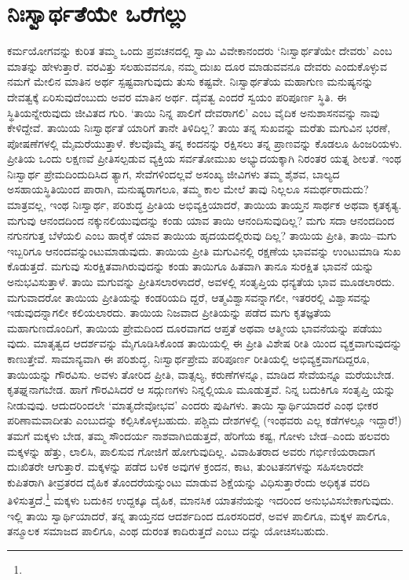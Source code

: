\section{ನಿಃಸ್ವಾರ್ಥತೆಯೇ ಒರೆಗಲ್ಲು}

ಕರ್ಮಯೋಗವನ್ನು ಕುರಿತ ತಮ್ಮ ಒಂದು ಪ್ರವಚನದಲ್ಲಿ ಸ್ವಾಮಿ ವಿವೇಕಾನಂದರು ‘ನಿಃಸ್ವಾರ್ಥತೆಯೇ ದೇವರು’ ಎಂಬ ಮಾತನ್ನು ಹೇಳುತ್ತಾರೆ. ವರವಿತ್ತು ಸಲಹುವವನೂ, ನಮ್ಮ ದುಃಖ ದೂರ ಮಾಡುವವನೂ ದೇವರು ಎಂದುಕೊಳ್ಳುವ ನಮಗೆ ಮೇಲಿನ ಮಾತಿನ ಅರ್ಥ ಸ್ಪಷ್ಟವಾಗುವುದು ತುಸು ಕಷ್ಟವೇ. ನಿಃಸ್ವಾರ್ಥತೆಯ ಮಹಾಗುಣ ಮನುಷ್ಯನನ್ನು ದೇವತ್ವಕ್ಕೆ ಏರಿಸುವುದೆಂಬುದು ಅವರ ಮಾತಿನ ಅರ್ಥ. ದೈವತ್ವ ಎಂದರೆ ಸ್ವಯಂ ಪರಿಪೂರ್ಣ ಸ್ಥಿತಿ. ಈ ಸ್ಥಿತಿಯನ್ನೇರುವುದು ಜೀವಿತದ ಗುರಿ. ‘ತಾಯಿ ನಿನ್ನ ಪಾಲಿಗೆ ದೇವರಾಗಲಿ’ ಎಂಬ ವೈದಿಕ ಅನುಶಾಸನವನ್ನು ನಾವು ಕೇಳಿದ್ದೇವೆ. ತಾಯಿಯ ನಿಃಸ್ವಾರ್ಥತೆ ಯಾರಿಗೆ ತಾನೇ ತಿಳಿದಿಲ್ಲ? ತಾಯಿ ತನ್ನ ಸುಖವನ್ನು ಮರೆತು ಮಗುವಿನ ಭರಣೆ, ಪೋಷಣೆಗಳಲ್ಲಿ ಮೈಮರೆಯುತ್ತಾಳೆ. ಕೆಲವೊಮ್ಮೆ ತನ್ನ ಕಂದನನ್ನು ರಕ್ಷಿಸಲು ತನ್ನ ಪ್ರಾಣವನ್ನು ಕೊಡಲೂ ಹಿಂಜರಿಯಳು. ಪ್ರೀತಿಯ ಒಂದು ಲಕ್ಷಣವೆ ಪ್ರೀತಿಸಲ್ಪಡುವ ವ್ಯಕ್ತಿಯ ಸರ್ವತೋಮುಖ ಅಭ್ಯುದಯಕ್ಕಾಗಿ ನಿರಂತರ ಯತ್ನ ಶೀಲತೆ. ಇಂಥ ನಿಃಸ್ವಾರ್ಥ ಪ್ರೇಮದಿಂದುದಿಸಿದ ತ್ಯಾಗ, ಸೇವೆಗಳಿಂದಲ್ಲವೆ ಅಸಂಖ್ಯ ಜೀವಿಗಳು ತಮ್ಮ ಶೈಶವ, ಬಾಲ್ಯದ ಅಸಹಾಯಸ್ಥಿತಿಯಿಂದ ಪಾರಾಗಿ, ಮನುಷ್ಯರಾಗಲೂ, ತಮ್ಮ ಕಾಲ ಮೇಲೆ ತಾವು ನಿಲ್ಲಲೂ ಸಮರ್ಥರಾದುದು? ಮಾತ್ರವಲ್ಲ, ಇಂಥ ನಿಃಸ್ವಾರ್ಥ, ಪರಿಶುದ್ಧ ಪ್ರೀತಿಯ ಅಭಿವ್ಯಕ್ತಿಯಾದರೆ, ತಾಯಿಯ ತಾಯ್ತನ ಸಾರ್ಥಕ ಅಥವಾ ಕೃತಕೃತ್ಯ. ಮಗುವು ಆನಂದದಿಂದ ನಕ್ಕುನಲಿಯುವುದನ್ನು ಕಂಡು ಯಾವ ತಾಯಿ ಆನಂದಿಸುವುದಿಲ್ಲ? ಮಗು ಸದಾ ಆನಂದದಿಂದ ನಗುನಗುತ್ತ ಬೆಳೆಯಲಿ ಎಂಬ ಹಾರೈಕೆ ಯಾವ ತಾಯಿಯ ಹೃದಯದಲ್ಲಿರುವು ದಿಲ್ಲ? ತಾಯಿಯ ಪ್ರೀತಿ, ತಾಯಿ–ಮಗು ಇಬ್ಬರಿಗೂ ಆನಂದವನ್ನುಂಟುಮಾಡುವುದು. ತಾಯಿಯ ಪ್ರೀತಿ ಮಗುವಿನಲ್ಲಿ ರಕ್ಷಣೆಯ ಭಾವವನ್ನು ಉಂಟುಮಾಡಿ ಸುಖ ಕೊಡುತ್ತದೆ. ಮಗುವು ಸುರಕ್ಷಿತವಾಗಿರುವುದನ್ನು ಕಂಡು ತಾಯಿಗೂ ಹಿತವಾಗಿ ತಾನೂ ಸುರಕ್ಷಿತ ಭಾವನೆ ಯನ್ನು ಅನುಭವಿಸುತ್ತಾಳೆ. ತಾಯಿ ಮಗುವನ್ನು ಪ್ರೀತಿಸಲಾರಳಾದರೆ, ಅವಳಲ್ಲಿ ಸಂತೃಪ್ತಿಯ ಧನ್ಯತೆಯ ಭಾವ ಮೂಡಲಾರದು. ಮಗುವಾದರೋ ತಾಯಿಯ ಪ್ರೀತಿಯನ್ನು ಕಂಡರಿಯದಿ ದ್ದರೆ, ಆತ್ಮವಿಶ್ವಾಸವನ್ನಾಗಲೀ, ಇತರರಲ್ಲಿ ವಿಶ್ವಾಸವನ್ನು ಇಡುವುದನ್ನಾಗಲೀ ಕಲಿಯಲಾರದು. ತಾಯಿಯ ನಿಜವಾದ ಪ್ರೀತಿಯನ್ನು ಪಡೆದ ಮಗು ಕೃತಜ್ಞತೆಯ ಮಹಾಗುಣದೊಂದಿಗೆ, ತಾಯಿಯ ಪ್ರೇಮದಿಂದ ದೂರವಾಗದ ಆಪ್ತತೆ ಅಥವಾ ಆತ್ಮೀಯ ಭಾವನೆಯನ್ನು ಪಡೆಯು ವುದು. ಮಾತೃತ್ವದ ಆದರ್ಶವನ್ನು ಮೈಗೂಡಿಸಿಕೊಂಡ ತಾಯಿಯಲ್ಲಿ ಈ ಪ್ರೀತಿ ವಿಶೇಷ ರೀತಿ ಯಿಂದ ವ್ಯಕ್ತವಾಗುವುದನ್ನು ಕಾಣುತ್ತೇವೆ. ಸಾಮಾನ್ಯವಾಗಿ ಈ ಪರಿಶುದ್ಧ, ನಿಃಸ್ವಾರ್ಥಪ್ರೇಮ ಪರಿಪೂರ್ಣ ರೀತಿಯಲ್ಲಿ ಅಭಿವ್ಯಕ್ತವಾಗದಿದ್ದರೂ, ತಾಯಿಯನ್ನು ಗೌರವಿಸು. ಅವಳು ತೋರಿದ ಪ್ರೀತಿ, ವಾತ್ಸಲ್ಯ, ಕರುಣೆಗಳನ್ನೂ, ಮಾಡಿದ ಸೇವೆಯನ್ನೂ ಮರೆಯಬೇಡ. ಕೃತಘ್ನನಾಗಬೇಡ. ಹಾಗೆ ಗೌರವಿಸಿದರೆ ಆ ಸದ್ಗುಣಗಳು ನಿನ್ನಲ್ಲಿಯೂ ಮೂಡುತ್ತವೆ. ನಿನ್ನ ಬದುಕಿಗೂ ಸಂತೃಪ್ತಿ ಯನ್ನು ನೀಡುವುವು. ಆದುದರಿಂದಲೇ ‘ಮಾತೃದೇವೋಭವ’ ಎಂದರು ಪುಷಿಗಳು. ತಾಯಿ ಸ್ವಾರ್ಥಿಯಾದರೆ ಎಂಥ ಭೀಕರ ಪರಿಣಾಮವಾದೀತು ಎಂಬುದನ್ನು ಕಲ್ಪಿಸಿಕೊಳ್ಳಬಹುದು. ಪಶ್ಚಿಮ ದೇಶಗಳಲ್ಲಿ (ಇಂಥವರು ಎಲ್ಲ ಕಡೆಗಳಲ್ಲೂ ಇದ್ದಾರೆ!) ತಮಗೆ ಮಕ್ಕಳು ಬೇಡ, ತಮ್ಮ ಸೌಂದರ್ಯ ನಾಶವಾಗಿಬಿಡುತ್ತದೆ, ಹೆರಿಗೆಯ ಕಷ್ಟ, ಗೋಳು ಬೇಡ–ಎಂದು ಹಲವರು ಮಕ್ಕಳನ್ನು ಹೆತ್ತು, ಲಾಲಿಸಿ, ಪಾಲಿಸುವ ಗೋಜಿಗೆ ಹೋಗುವುದಿಲ್ಲ. ವಿವಾಹಿತರಾದ ಅವರು ಗರ್ಭಿಣಿಯರಾದಾಗ ದುಃಖಿತರೇ ಆಗುತ್ತಾರೆ. ಮಕ್ಕಳನ್ನು ಪಡೆದ ಬಳಿಕ ಅವುಗಳ ಕ್ರಂದನ, ಕಾಟ, ತುಂಟತನಗಳನ್ನು ಸಹಿಸಲಾರದೇ ಕುಪಿತರಾಗಿ ತೀವ್ರತರದ ದೈಹಿಕ ತೊಂದರೆಯನ್ನುಂಟು ಮಾಡುವ ಶಿಕ್ಷೆಯನ್ನು ವಿಧಿಸುತ್ತಾರೆಂದು ಅಧಿಕೃತ ವರದಿ ತಿಳಿಸುತ್ತದೆ.\footnote{} ಮಕ್ಕಳು ಬದುಕಿನ ಉದ್ದಕ್ಕೂ ದೈಹಿಕ, ಮಾನಸಿಕ ಯಾತನೆಯನ್ನು ಇದರಿಂದ ಅನುಭವಿಸಬೇಕಾಗುವುದು. ಇಲ್ಲಿ ತಾಯಿ ಸ್ವಾರ್ಥಿಯಾದರೆ, ತನ್ನ ತಾಯ್ತನದ ಆದರ್ಶದಿಂದ ದೂರಸರಿದರೆ, ಅವಳ ಪಾಲಿಗೂ, ಮಕ್ಕಳ ಪಾಲಿಗೂ, ತನ್ಮೂಲಕ ಸಮಾಜದ ಪಾಲಿಗೂ, ಎಂಥ ದುರಂತ ಕಾದಿರುತ್ತದೆ ಎಂಬು ದನ್ನು ಯೋಚಿಸಬಹುದು.

